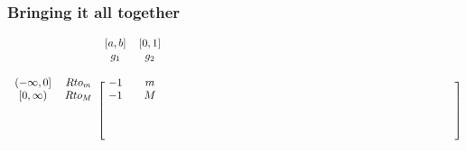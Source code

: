 \documentclass{beamer}
\def\w{\color{white}}
\begin{document}
\begin{frame}[shrink=25]
\frametitle{Bringing it all together}

    \begin{equation*}
        \begin{blockarray}{cccccccccc}
                               &                   & [a,b]             &
            [0,1]              &\w(-\infty,\infty) &\w(-\infty,\infty) &
            \w[0,1]            &\w(-\infty,\infty) & \w[0,1]           &
            \w(-\infty,\infty) \\ 
                               &                   & g_{1}             &
            g_{2}              & \w s_{1}          & \w s_{2}          &
            \w E_{f}^{1}       & \w E_{d}^{1}      & \w I_{f}^{1}      &
            \w I_{d}^{1}       \\
                               &                   &                   &
                               &                   &                   &
                               &                   &                   &
             \\ 
            \begin{block}{cc[cccccccc]}
            {(-\infty,0]}      & Rto_{m}           & -1                &
            m                  &                   &                   &
                               &                   &                   &
             \\
            {[0,\infty)}       & Rto_{M}           & -1                &
            M                  &                   &                   &
                               &                   &                   &
             \\
            \w {[-1,0]}        & \w E_{f}^{1}      &\w f_{g_{1}}^{E^{1}}&
            \w f_{g_{2}}^{E^{1}}&                   &                   &
            \w -1              &                   &                   &
             \\
            \w {[0,0]}         & \w E_{d}^{1}      &                   &
                               &\w f_{s_{1}}^{E^{1}}& \w f_{s_{2}}^{E^{1}}&
                               & \w -1             &                   &
             \\
            \w {[E_{c}^{1},E_{c}^{1}]} 
                               & \w E_{b}^{1}      &                   &
                               &                   &                   &
            \w 1               & \w -1             &                   &
             \\

\end{block}
\end{blockarray}
\end{equation*}
\end{frame}
\end{document}
